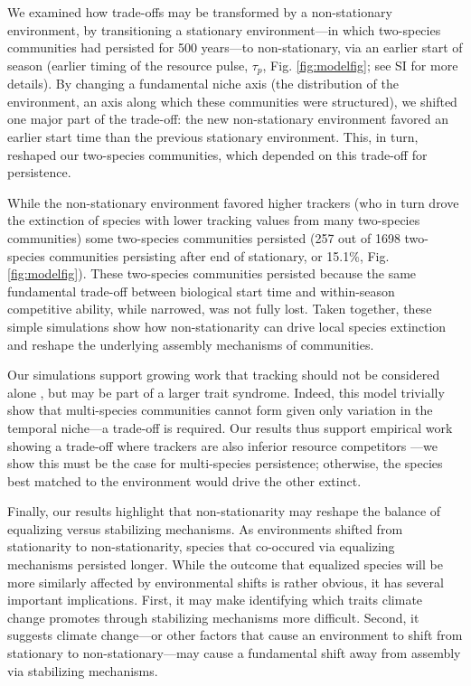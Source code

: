 \documentclass[11pt,letterpaper]{article}
\begin{document}
We examined how trade-offs may be transformed by a non-stationary environment, by transitioning a stationary environment---in which two-species communities had persisted for 500 years---to non-stationary, via an earlier start of season (earlier timing of the resource pulse, $\tau_p$, Fig. \ref{fig:modelfig}; see SI for more details). By changing a fundamental niche axis (the distribution of the environment, an axis along which these communities were structured), we shifted one major part of the trade-off: the new non-stationary environment favored an earlier start time than the previous stationary environment. This, in turn, reshaped our two-species communities, which depended on this trade-off for persistence. 

While the non-stationary environment favored higher trackers (who in turn drove the extinction of species with lower tracking values from many two-species communities) some two-species communities persisted (257 out of 1698 two-species communities persisting after end of stationary, or 15.1\%, Fig. \ref{fig:modelfig}). These two-species communities persisted because the same fundamental trade-off between biological start time and within-season competitive ability, while narrowed, was not fully lost. Taken together, these simple simulations show how non-stationarity can drive local species extinction and reshape the underlying assembly mechanisms of communities.

Our simulations support growing work that tracking should not be considered alone \citep{Diamond:2011nx,Dorji2013,Ishioka2013,kharouba2014,du2017}, but may be part of a larger trait syndrome. Indeed, this model trivially show that multi-species communities cannot form given only variation in the temporal niche---a trade-off is required. Our results thus support empirical work showing a trade-off where trackers are also inferior resource competitors \citep{lasky2016,Zhu2016BioLetters}---we show this must be the case for multi-species persistence; otherwise, the species best matched to the environment would drive the other extinct.

Finally, our results highlight that non-stationarity may reshape the balance of equalizing versus stabilizing mechanisms. As environments shifted from stationarity to non-stationarity, species that co-occured via equalizing mechanisms persisted longer. While the outcome that equalized species will be more similarly affected by environmental shifts is rather obvious, it has several important implications. First, it may make identifying which traits climate change promotes through stabilizing mechanisms more difficult. Second, it suggests climate change---or other factors that cause an environment to shift from stationary to non-stationary---may cause a fundamental shift away from assembly via stabilizing mechanisms. %
\end{document}
